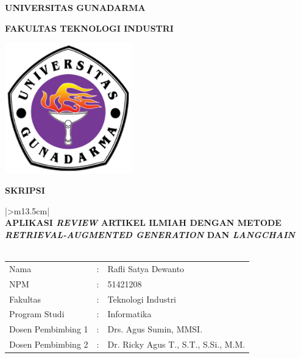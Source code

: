 \documentclass[12pt,oneside,bahasa]{book}
\providecommand{\tabularnewline}{\\}
\newcommand{\Judul}{Aplikasi \textit {Review} Artikel Ilmiah dengan metode \textit {Retrieval-Augmented Generation} Dan \textit {Langchain} }
\newcommand{\Penulis}{Rafli Satya Dewanto}
\newcommand{\NPM}{51421208}
\newcommand{\Fakultas}{Teknologi Industri}
\newcommand{\Jurusan}{Informatika}
\newcommand{\DosenPembimbingA}{Drs. Agus Sumin, MMSI.}
\newcommand{\DosenPembimbingB}{Dr. Ricky Agus T., S.T., S.Si., M.M.}
\begin{document}
 
\sloppy 
\thispagestyle{empty}


\pagestyle{romanstyle}

\vspace*{10mm}

\begin{center}
{\large\textbf{UNIVERSITAS GUNADARMA}}{\large\par}
\par\end{center}

\begin{center}
{\large\textbf{FAKULTAS \MakeUppercase{\Fakultas}}}{\large\par}
\par\end{center}

\vspace*{10mm}

\begin{center}
\includegraphics[width=55mm]{images/gundarlogo.png}
\par\end{center}

\vspace*{3mm}

\begin{center}
{\Large\textbf{SKRIPSI}}{\Large\par}
\par\end{center}

\vspace*{7mm}

\begin{center}
\begin{tabular}{|>{\centering}m{13.5cm}|}
\hline 
\centering{}~~\tabularnewline
\centering{}\textbf{\MakeUppercase{\Judul}}\tabularnewline
~~\tabularnewline
\centering{}%
\begin{tabular}{lcl}
Nama & : & \Penulis\tabularnewline
NPM & : & \NPM\tabularnewline
Fakultas & : & \Fakultas\tabularnewline
Program Studi & : & \Jurusan\tabularnewline
Dosen Pembimbing 1 & : & \DosenPembimbingA\tabularnewline
Dosen Pembimbing 2 & : & \DosenPembimbingB\tabularnewline
\end{tabular}\tabularnewline
~~\tabularnewline
\hline 
\end{tabular}
\par\end{center}
\end{document}
